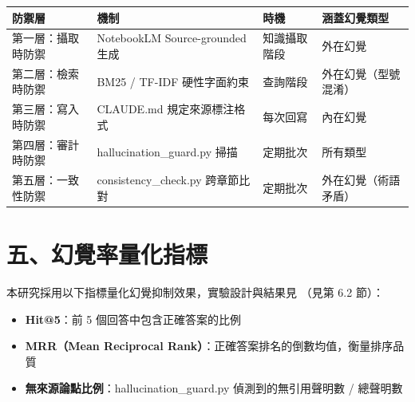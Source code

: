{\def\LTcaptype{none} %
\begin{longtable}[]{@{}
  >{\raggedright\arraybackslash}p{}
  >{\raggedright\arraybackslash}p{}
  >{\raggedright\arraybackslash}p{}
  >{\raggedright\arraybackslash}p{}@{}}
\toprule\noalign{}
\begin{minipage}[b]{\linewidth}\raggedright
防禦層
\end{minipage} & \begin{minipage}[b]{\linewidth}\raggedright
機制
\end{minipage} & \begin{minipage}[b]{\linewidth}\raggedright
時機
\end{minipage} & \begin{minipage}[b]{\linewidth}\raggedright
涵蓋幻覺類型
\end{minipage} \\
\midrule\noalign{}
\endhead
\bottomrule\noalign{}
\endlastfoot
第一層：攝取時防禦 & NotebookLM Source-grounded 生成 & 知識攝取階段 &
外在幻覺 \\
第二層：檢索時防禦 & BM25 / TF-IDF 硬性字面約束 & 查詢階段 &
外在幻覺（型號混淆） \\
第三層：寫入時防禦 & CLAUDE.md 規定來源標注格式 & 每次回寫 & 內在幻覺 \\
第四層：審計時防禦 & hallucination\_guard.py 掃描 & 定期批次 &
所有類型 \\
第五層：一致性防禦 & consistency\_check.py 跨章節比對 & 定期批次 &
外在幻覺（術語矛盾） \\
\end{longtable}
}

\section{五、幻覺率量化指標}\label{ux4e94ux5e7bux89baux7387ux91cfux5316ux6307ux6a19}

本研究採用以下指標量化幻覺抑制效果，實驗設計與結果見 （見第 6.2 節）：

\begin{itemize}
\tightlist
\item
  \textbf{Hit@5}：前 5 個回答中包含正確答案的比例
\item
  \textbf{MRR（Mean Reciprocal
  Rank）}：正確答案排名的倒數均值，衡量排序品質
\item
  \textbf{無來源論點比例}：hallucination\_guard.py 偵測到的無引用聲明數
  / 總聲明數
\end{itemize}

